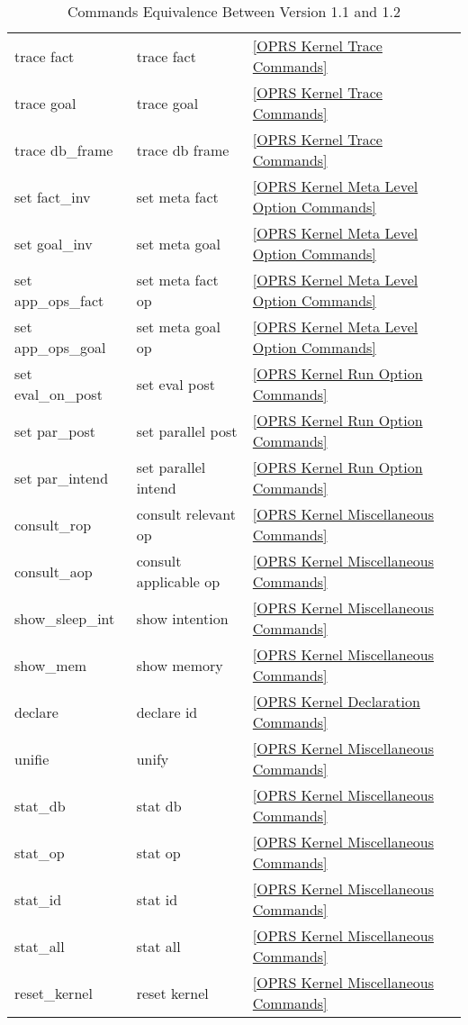 \begin{table}
\begin{center}
\begin{tabular}{||l|l|l||}
 trace fact & trace fact & \ref{OPRS Kernel Trace Commands} \\
 trace goal & trace goal & \ref{OPRS Kernel Trace Commands} \\
 trace db\_frame & trace db frame & \ref{OPRS Kernel Trace Commands} \\
 set fact\_inv & set meta fact & \ref{OPRS Kernel Meta Level Option Commands} \\
 set goal\_inv & set meta goal & \ref{OPRS Kernel Meta Level Option Commands} \\
 set app\_ops\_fact & set meta fact op & \ref{OPRS Kernel Meta Level Option Commands} \\
 set app\_ops\_goal & set meta goal op & \ref{OPRS Kernel Meta Level Option Commands} \\
 set eval\_on\_post & set eval post & \ref{OPRS Kernel Run Option Commands} \\
 set par\_post & set parallel post & \ref{OPRS Kernel Run Option Commands} \\
 set par\_intend & set parallel intend & \ref{OPRS Kernel Run Option Commands} \\
 consult\_rop & consult relevant op & \ref{OPRS Kernel Miscellaneous Commands} \\
 consult\_aop & consult applicable op & \ref{OPRS Kernel Miscellaneous Commands} \\
 show\_sleep\_int & show intention & \ref{OPRS Kernel Miscellaneous Commands} \\
 show\_mem & show memory & \ref{OPRS Kernel Miscellaneous Commands} \\
 declare & declare id & \ref{OPRS Kernel Declaration Commands} \\
 unifie & unify & \ref{OPRS Kernel Miscellaneous Commands} \\
 stat\_db & stat db & \ref{OPRS Kernel Miscellaneous Commands} \\
 stat\_op & stat op & \ref{OPRS Kernel Miscellaneous Commands} \\
 stat\_id & stat id & \ref{OPRS Kernel Miscellaneous Commands} \\
 stat\_all & stat all & \ref{OPRS Kernel Miscellaneous Commands} \\
 reset\_kernel & reset kernel & \ref{OPRS Kernel Miscellaneous Commands} \\
\hline
\end{tabular}
\end{center}
\caption{Commands Equivalence Between Version 1.1 and 1.2}
\end{table}

